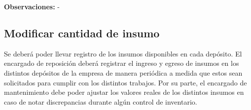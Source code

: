 \documentclass[a4paper, 12pt,twoside]{report}  %
\numberwithin{equation}{subsection} %
\begin{document}
\begin{table}[h!]
\begin{tabularx}
		\hline
		{\textbf{Observaciones:} - }\\
		
		\hline
	\end{tabularx}
	\caption*{Tabla A.: Refinamiento de \hyperlink{US}{US} 4.}
\end{table}


\pagebreak

\subsection*{Modificar cantidad de insumo}
Se deberá poder llevar registro de los insumos disponibles en cada depósito. El encargado de reposición deberá registrar el ingreso y egreso de insumos en los distintos depósitos de la empresa de manera periódica a medida que estos sean solicitados para cumplir con los distintos trabajos. Por su parte, el encargado de mantenimiento debe poder ajustar los valores reales de los distintos insumos en caso de notar discrepancias durante algún control de inventario.

\renewcommand{\arraystretch}{1.4}
\end{document}
